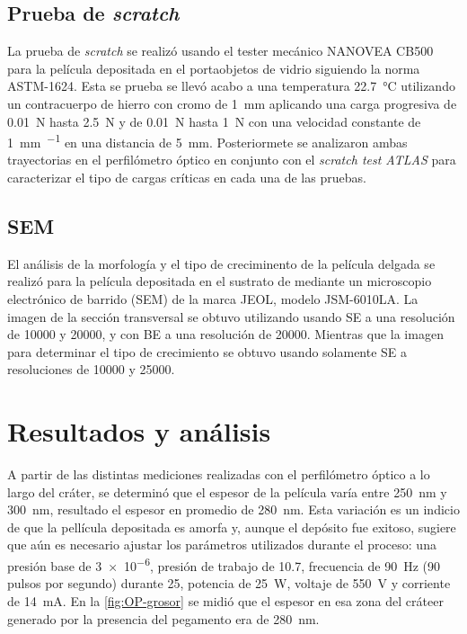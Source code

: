 \documentclass[12pt]{IEEEtran}
\begin{document}
\subsection{Prueba de \emph{scratch}}

La prueba de \emph{scratch} se realizó usando el tester mecánico NANOVEA CB500 para la película depositada en el portaobjetos de vidrio siguiendo la norma ASTM-1624\cite{internationalStandardTestMethod}. Esta se prueba se llevó acabo a una temperatura \qty{22.7}{\degreeCelsius} utilizando un contracuerpo de hierro con cromo de \qty{1}{\mm} aplicando una carga progresiva de \qty{0.01}{\N} hasta \qty{2.5}{\N} y de \qty{0.01}{\N} hasta \qty{1}{\N} con una velocidad constante de \qty{1}{\mm\per\min} en una distancia de \qty{5}{\mm}. Posteriormete se analizaron ambas trayectorias en el perfilómetro óptico en conjunto con el \emph{scratch test ATLAS} para caracterizar el tipo de cargas críticas en cada una de las pruebas.

\subsection{SEM}

El análisis de la morfología y el tipo de creciminento de la película delgada se realizó para la película depositada en el sustrato de  mediante un microscopio electrónico de barrido (SEM) de la marca JEOL, modelo JSM-6010LA. La imagen de la sección transversal se obtuvo utilizando usando SE a una resolución de \num{10000} y \num{20000}, y con BE a una resolución de \num{20000}. Mientras que la imagen para determinar el tipo de crecimiento se obtuvo usando solamente SE a resoluciones de \num{10000} y \num{25000}.

\section{Resultados y análisis}

A partir de las distintas mediciones realizadas con el perfilómetro óptico a lo largo del cráter, se determinó que el espesor de la película varía entre \qty{250}{\nm} y \qty{300}{\nm}, resultado el espesor en promedio de \qty{280}{\nm}. Esta variación es un indicio de que la pellícula depositada es amorfa y, aunque el depósito fue exitoso, sugiere que aún es necesario ajustar los parámetros utilizados durante el proceso: una presión base de \qty{3e-6}{\Torr}, presión de trabajo de \qty{10.7}{\mTorr}, frecuencia de \qty{90}{\Hz} (90 pulsos por segundo) durante \qty{25}{\min}, potencia de \qty{25}{\W}, voltaje de \qty{550}{\V} y corriente de \qty{14}{\mA}. En la \cref{fig:OP-grosor} se midió que el espesor en esa zona del cráteer generado por la presencia del pegamento era de \qty{280}{\nm}.
\end{document}

